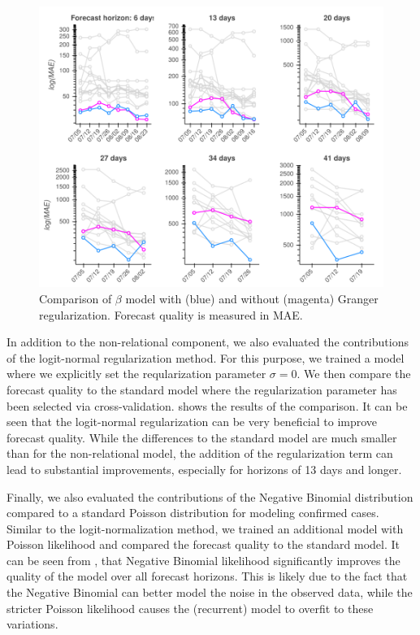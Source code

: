 \documentclass[nobib]{tufte-handout}
\newcommand{\bAR}{\ensuremath{\beta}\text{-AR}\xspace}
\begin{document}
\begin{figure}[htbp]
\centering
\includegraphics[width=\columnwidth]{img/us_mae_granger_ablation/us_mae_granger_ablation.png}
\caption{\label{fig:mae-covidhub-granger}Comparison of \bAR model with (blue) and without (magenta) Granger regularization. Forecast quality is measured in MAE.}
\end{figure}

In addition to the non-relational component, we also evaluated the contributions
of the logit-normal regularization method. For this purpose, we trained a model
where we explicitly set the reqularization parameter \(\sigma = 0\). We then
compare the forecast quality to the standard model where the regularization
parameter has been selected via cross-validation. 
shows the results of the comparison. It can be seen that the logit-normal
regularization can be very beneficial to improve forecast quality. While the
differences to the standard model are much smaller than for the non-relational
model, the addition of the regularization term can lead to substantial
improvements, especially for horizons of 13 days and longer.

Finally, we also evaluated the contributions of the Negative Binomial
distribution compared to a standard Poisson distribution for modeling confirmed
cases. Similar to the logit-normalization method, we trained an additional model
with Poisson likelihood and compared the forecast quality to the standard model.
It can be seen from , that Negative Binomial likelihood
significantly improves the quality of the model over all forecast horizons. This
is likely due to the fact that the Negative Binomial can better model the noise
in the observed data, while the stricter Poisson likelihood causes the
(recurrent) model to overfit to these variations.
\end{document}

